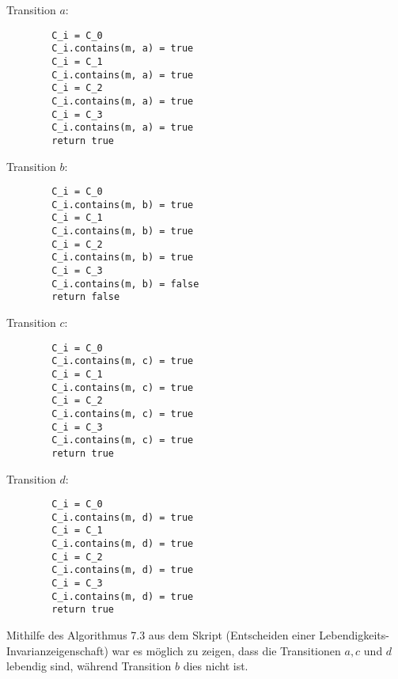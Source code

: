 \documentclass[10pt,a4paper,oneside,ngerman,numbers=noenddot]{scrartcl}
\begin{document}
	Transition \(a\):
	\begin{verbatim}
		C_i = C_0
		C_i.contains(m, a) = true
		C_i = C_1
		C_i.contains(m, a) = true
		C_i = C_2
		C_i.contains(m, a) = true
		C_i = C_3
		C_i.contains(m, a) = true
		return true
	\end{verbatim}
	
	Transition \(b\):
	\begin{verbatim}
		C_i = C_0
		C_i.contains(m, b) = true
		C_i = C_1
		C_i.contains(m, b) = true
		C_i = C_2
		C_i.contains(m, b) = true
		C_i = C_3
		C_i.contains(m, b) = false
		return false
	\end{verbatim}
	
	Transition \(c\):
	\begin{verbatim}
		C_i = C_0
		C_i.contains(m, c) = true
		C_i = C_1
		C_i.contains(m, c) = true
		C_i = C_2
		C_i.contains(m, c) = true
		C_i = C_3
		C_i.contains(m, c) = true
		return true
	\end{verbatim}
	
	Transition \(d\):
	\begin{verbatim}
		C_i = C_0
		C_i.contains(m, d) = true
		C_i = C_1
		C_i.contains(m, d) = true
		C_i = C_2
		C_i.contains(m, d) = true
		C_i = C_3
		C_i.contains(m, d) = true
		return true
	\end{verbatim}
	
	Mithilfe des Algorithmus 7.3 aus dem Skript (Entscheiden einer Lebendigkeits-Invarianzeigenschaft) war es möglich zu zeigen, dass die Transitionen \(a,c\) und \(d\) lebendig sind, während Transition \(b\) dies nicht ist.
	
\end{document}
